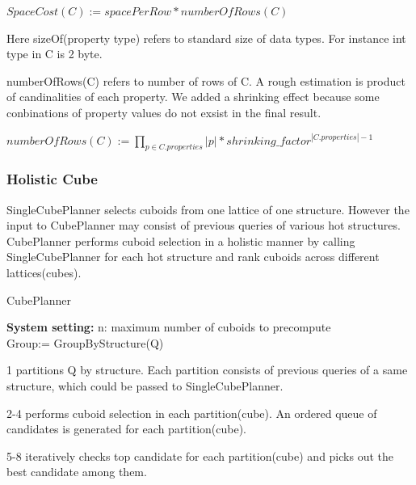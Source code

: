$SpaceCost(C):= spacePerRow *  numberOfRows(C)$
 
Here sizeOf(property type) refers to standard size of data types. For instance int type in C is 2 byte.

numberOfRows(C) refers to number of rows of C. A rough estimation is product of candinalities of each property.  We added a shrinking effect because some conbinations of property values do not exsist in the final result. 
 
$numberOfRows(C):= \displaystyle{\prod_{p\in C.properties}|p|} * shrinking\_factor^{|C.properties|-1}$

\subsubsection{Holistic Cube}

SingleCubePlanner selects cuboids from one lattice of one structure. However the input to CubePlanner may consist of previous queries of various hot structures. CubePlanner performs cuboid selection in a holistic manner by calling SingleCubePlanner for each hot structure and rank cuboids across different lattices(cubes). 

\begin{algorithm}[H]
	\caption{CubePlanner}
	\LinesNumbered 
	\textbf{System setting:} n: maximum number of cuboids to precompute\\ 
	Group:= GroupByStructure(Q) \;
	
	
\end{algorithm}
\clearpage

1 partitions Q by structure. Each partition consists of previous queries of a same structure, which could be passed to SingleCubePlanner.

2-4 performs cuboid selection in each partition(cube). An ordered queue of candidates is generated for each partition(cube).

5-8 iteratively checks top candidate for each partition(cube) and picks out the best candidate among them.   

